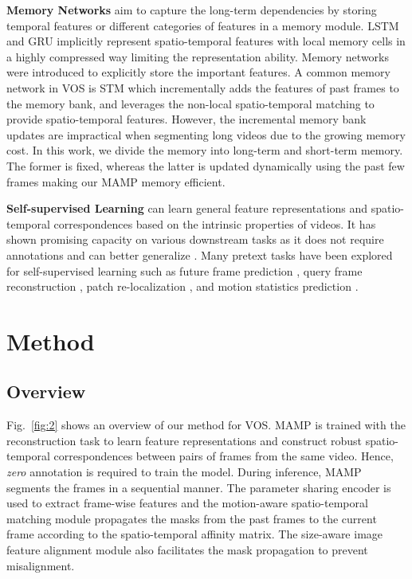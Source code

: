\documentclass[letterpaper]{article} \usepackage{aaai22}  \usepackage{times}  \usepackage{helvet}  \usepackage{courier}  \usepackage[hyphens]{url}  \usepackage{graphicx} \urlstyle{rm} \def\UrlFont{\rm}  \usepackage{natbib}  \usepackage{caption} \DeclareCaptionStyle{ruled}{labelfont=normalfont,labelsep=colon,strut=off} \frenchspacing  \setlength{\pdfpagewidth}{8.5in}  \setlength{\pdfpageheight}{11in}  \usepackage{algorithm}
\begin{document}
{\noindent\textbf{Memory Networks}} aim to capture the long-term dependencies by storing temporal features or different categories of features in a memory module. LSTM \cite{LSTM} and GRU \cite{GRU} implicitly represent spatio-temporal features with local memory cells in a highly compressed way limiting the representation ability. Memory networks \cite{MemNet} were introduced to explicitly store the important features. A common memory network in VOS is STM \cite{STM} which incrementally adds the features of past frames to the memory bank, and leverages the non-local spatio-temporal matching to provide spatio-temporal features. However, the incremental memory bank updates are impractical when segmenting long videos due to the growing memory cost. In this work, we divide the memory into long-term and short-term memory. The former is fixed, whereas the latter is updated dynamically using the past few frames making our MAMP memory efficient.


\noindent\textbf{Self-supervised Learning}
can learn general feature representations and spatio-temporal correspondences based on the intrinsic properties of videos. It has shown promising capacity on various downstream tasks as it does not require annotations and can better generalize \cite{Video_Color,PreDecode,UVC,CubicPuzz,FacePred,InterIntra,VideoMoCo}. Many pretext tasks have been explored for self-supervised learning such as future frame prediction \cite{FuFramePred}, query frame reconstruction \cite{CorrFlow,RPMNet,MAST}, patch re-localization \cite{CycleTime,MuG}, and motion statistics prediction \cite{MotionStat}.

\section{Method}
\subsection{Overview}
Fig.~\ref{fig:2} shows an overview of our method for VOS. MAMP is trained with the reconstruction task to learn feature representations and construct robust spatio-temporal correspondences between pairs of frames from the same video. Hence, \emph{zero} annotation is required to train the model. During inference, MAMP segments the frames in a sequential manner. The parameter sharing encoder is used to extract frame-wise features and the motion-aware spatio-temporal matching module propagates the masks from the past frames to the current frame according to the spatio-temporal affinity matrix. The size-aware image feature alignment module also facilitates the mask propagation to prevent misalignment.
\end{document}
